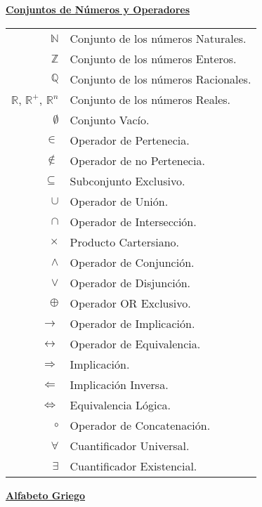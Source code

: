 \begin{center}
\underline{\bf Conjuntos de Números y Operadores}
\end{center}

\begin{table}[h]
\begin{center}
\begin{tabular}{r|l}
    $\mathbb{N}$ & Conjunto de los números Naturales. \\
    $\mathbb{Z}$ & Conjunto de los números Enteros. \\ 
    $\mathbb{Q}$ & Conjunto de los números Racionales. \\
    $\mathbb{R}$, $\mathbb{R}^+$, $\mathbb{R}^n$ & Conjunto de los números Reales. \\
    $\emptyset$ & Conjunto Vacío. \\
    $\in$ & Operador de Pertenecia. \\
    $\notin$ & Operador de no Pertenecia. \\
    $\subseteq$ & Subconjunto Exclusivo. \\
    $\cup$ & Operador de Unión. \\
    $\cap$ & Operador de Intersección. \\
    $\times$ & Producto Cartersiano. \\ 
    $\wedge$ & Operador de Conjunción. \\
    $\vee$ & Operador de Disjunción. \\
    $\oplus$ & Operador OR Exclusivo. \\
    $\rightarrow$ & Operador de Implicación. \\
    $\leftrightarrow$ & Operador de Equivalencia. \\
    $\Rightarrow$ & Implicación. \\
    $\Leftarrow$ & Implicación Inversa. \\
    $\Leftrightarrow$ & Equivalencia Lógica. \\
    $\circ$ & Operador de Concatenación. \\
    $\forall$ & Cuantificador Universal. \\
    $\exists$ & Cuantificador Existencial.          
\end{tabular}
\end{center}
\end{table}

\newpage

\begin{center}
\underline{\bf Alfabeto Griego}
\end{center}

